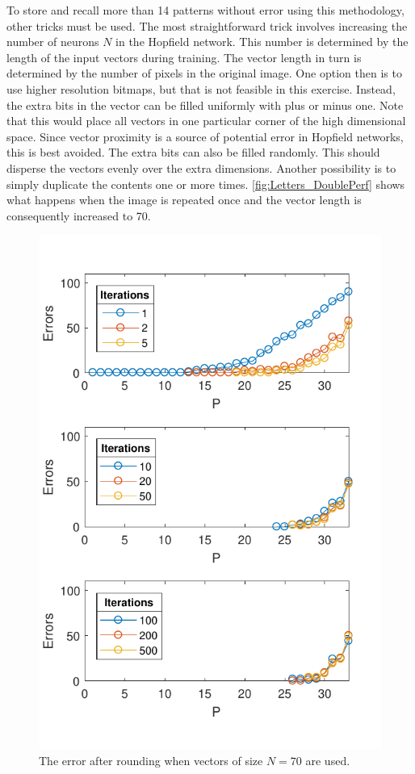 \documentclass[a4, 10pt, twoside, twocolumn]{article}
\numberwithin{figure}{section}
\begin{document}
To store and recall more than 14 patterns without error using this methodology, other tricks must be used. The most straightforward trick involves increasing the number of neurons $N$ in the Hopfield network. This number is determined by the length of the input vectors during training. The vector length in turn is determined by the number of pixels in the original image. One option then is to use higher resolution bitmaps, but that is not feasible in this exercise. Instead, the extra bits in the vector can be filled uniformly with plus or minus one. Note that this would place all vectors in one particular corner of the high dimensional space. Since vector proximity is a source of potential error in Hopfield networks, this is best avoided. The extra bits can also be filled randomly. This should disperse the vectors evenly over the extra dimensions. Another possibility is to simply duplicate the contents one or more times. \autoref{fig:Letters_DoublePerf} shows what happens when the image is repeated once and the vector length is consequently increased to 70.

\begin{figure}[ht]
    \includegraphics[width=\linewidth]{img/Letters_DoublePerf.pdf}
    \caption{The error after rounding when vectors of size $N=70$ are used.}
    \label{fig:Letters_DoublePerf}
\end{figure}
\end{document}
